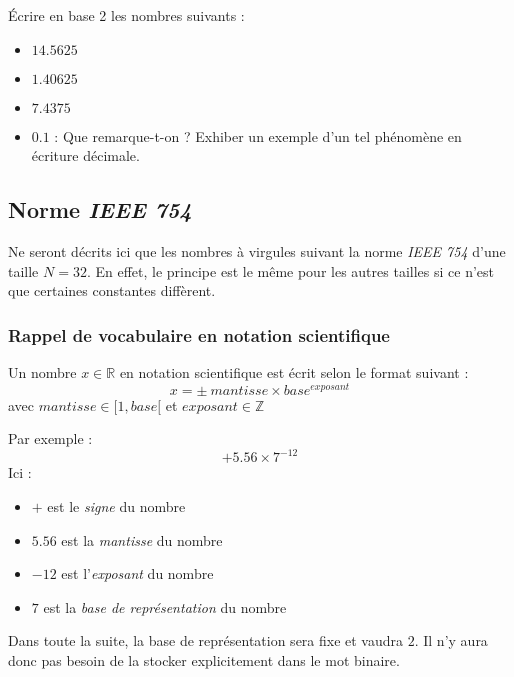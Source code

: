 \documentclass[../../main.tex]{subfiles}
\begin{document}
 Écrire en base 2 les nombres suivants :
\begin{itemize}
     \item $14.5625$
     \item $1.40625$
     \item $7.4375$
     \item $0.1$ : Que remarque-t-on ? Exhiber un exemple d'un tel phénomène en écriture décimale.
\end{itemize} 
\subsection{Norme \textit{IEEE 754}}
Ne seront décrits ici que les nombres à virgules suivant la norme \textit{IEEE 754} d'une taille $N = 32$. En effet, le principe est le même pour les autres tailles si ce n'est que certaines constantes diffèrent.

\subsubsection{Rappel de vocabulaire en notation scientifique} \label{ssub:rappel_de_vocabulaire_en_notation_scientifique}
Un nombre $x\in{\mathbb{R}}$ en notation scientifique est écrit selon le format suivant :
$$x = \pm\ mantisse \times{base^{exposant}}$$
avec $mantisse\in{[1, base[}$ et $exposant\in{\mathbb{Z}}$

Par exemple :
$$+ 5.56\times{7^{-12}}$$
Ici :
\begin{itemize}
     \item $+$ est le \textit{signe} du nombre
     \item $5.56$ est la \textit{mantisse} du nombre
     \item $-12$ est l'\textit{exposant} du nombre
     \item $7$ est la \textit{base de représentation} du nombre
\end{itemize}
Dans toute la suite, la base de représentation sera fixe et vaudra $2$. Il n'y aura donc pas besoin de la stocker explicitement dans le mot binaire.
\end{document}
